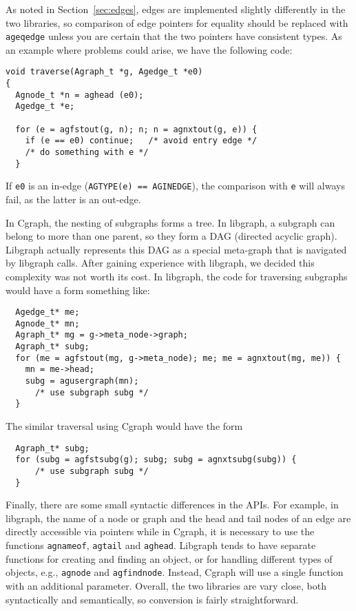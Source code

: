 \documentclass[11pt,letterpaper]{article}
\begin{document}
As noted in Section~\ref{sec:edges}, edges are implemented slightly
differently in the two libraries, so comparison of edge pointers for
equality should be replaced with \verb"ageqedge" unless you are certain
that the two pointers have consistent types. As an example where problems
could arise, we have the following code:
\begin{verbatim}
void traverse(Agraph_t *g, Agedge_t *e0)
{
  Agnode_t *n = aghead (e0);
  Agedge_t *e;
    
  for (e = agfstout(g, n); n; n = agnxtout(g, e)) {
    if (e == e0) continue;   /* avoid entry edge */
    /* do something with e */
  }
\end{verbatim}
If \verb"e0" is an in-edge (\verb"AGTYPE(e) == AGINEDGE"), the comparison
with \verb"e" will always fail, as the latter is an out-edge.

In Cgraph, the nesting of subgraphs forms a tree.
In libgraph, a subgraph can belong to more than one parent,
so they form a DAG (directed acyclic graph). Libgraph
actually represents this DAG as a special meta-graph
that is navigated by libgraph calls.  After gaining
experience with libgraph, we decided this complexity
was not worth its cost. In libgraph, the code for traversing
subgraphs would have a form something like\label{subg}:
\begin{verbatim}
  Agedge_t* me;
  Agnode_t* mn;
  Agraph_t* mg = g->meta_node->graph;
  Agraph_t* subg;
  for (me = agfstout(mg, g->meta_node); me; me = agnxtout(mg, me)) {
    mn = me->head;
    subg = agusergraph(mn);
      /* use subgraph subg */
  }
\end{verbatim}
The similar traversal using Cgraph would have the form
\begin{verbatim}
  Agraph_t* subg;
  for (subg = agfstsubg(g); subg; subg = agnxtsubg(subg)) {
      /* use subgraph subg */
  }
\end{verbatim}

Finally, there are some small syntactic differences in the APIs.
For example, in libgraph, the name of a node or graph and
the head and tail nodes of an edge are
directly accessible via pointers while in Cgraph, it is necessary to use
the functions \verb"agnameof", \verb"agtail" and \verb"aghead".
Libgraph tends to have separate functions for creating and finding
an object, or for handling different types of objects, e.g., 
\verb"agnode" and \verb"agfindnode". Instead, Cgraph will use a single function
with an additional parameter. Overall, the two libraries are vary close, both
syntactically and semantically, so conversion is fairly straightforward.
\end{document}
